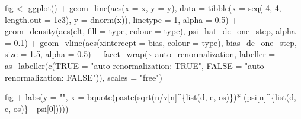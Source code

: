 \documentclass[
  11pt,
  openright,twoside]{book}
\newenvironment{Shaded}{\begin{snugshade}}{\end{snugshade}}
\newcommand{\AttributeTok}[1]{\textcolor[rgb]{0.77,0.63,0.00}{#1}}
\newcommand{\DecValTok}[1]{\textcolor[rgb]{0.00,0.00,0.81}{#1}}
\newcommand{\FloatTok}[1]{\textcolor[rgb]{0.00,0.00,0.81}{#1}}
\newcommand{\FunctionTok}[1]{\textcolor[rgb]{0.00,0.00,0.00}{#1}}
\newcommand{\NormalTok}[1]{#1}
\newcommand{\OtherTok}[1]{\textcolor[rgb]{0.56,0.35,0.01}{#1}}
\newcommand{\SpecialCharTok}[1]{\textcolor[rgb]{0.00,0.00,0.00}{#1}}
\newcommand{\StringTok}[1]{\textcolor[rgb]{0.31,0.60,0.02}{#1}}
\theoremstyle{definition}
\theoremstyle{definition}
\theoremstyle{definition}
\theoremstyle{definition}
\theoremstyle{remark}
\begin{document}
\begin{Shaded}
\begin{Highlighting}[]
\NormalTok{fig }\OtherTok{\textless{}{-}} \FunctionTok{ggplot}\NormalTok{() }\SpecialCharTok{+}
  \FunctionTok{geom\_line}\NormalTok{(}\FunctionTok{aes}\NormalTok{(}\AttributeTok{x =}\NormalTok{ x, }\AttributeTok{y =}\NormalTok{ y), }
            \AttributeTok{data =} \FunctionTok{tibble}\NormalTok{(}\AttributeTok{x =} \FunctionTok{seq}\NormalTok{(}\SpecialCharTok{{-}}\DecValTok{4}\NormalTok{, }\DecValTok{4}\NormalTok{, }\AttributeTok{length.out =} \FloatTok{1e3}\NormalTok{),}
                          \AttributeTok{y =} \FunctionTok{dnorm}\NormalTok{(x)),}
            \AttributeTok{linetype =} \DecValTok{1}\NormalTok{, }\AttributeTok{alpha =} \FloatTok{0.5}\NormalTok{) }\SpecialCharTok{+}
  \FunctionTok{geom\_density}\NormalTok{(}\FunctionTok{aes}\NormalTok{(clt, }\AttributeTok{fill =}\NormalTok{ type, }\AttributeTok{colour =}\NormalTok{ type),}
\NormalTok{               psi\_hat\_de\_one\_step, }\AttributeTok{alpha =} \FloatTok{0.1}\NormalTok{) }\SpecialCharTok{+}
  \FunctionTok{geom\_vline}\NormalTok{(}\FunctionTok{aes}\NormalTok{(}\AttributeTok{xintercept =}\NormalTok{ bias, }\AttributeTok{colour =}\NormalTok{ type),}
\NormalTok{             bias\_de\_one\_step, }\AttributeTok{size =} \FloatTok{1.5}\NormalTok{, }\AttributeTok{alpha =} \FloatTok{0.5}\NormalTok{) }\SpecialCharTok{+}
  \FunctionTok{facet\_wrap}\NormalTok{(}\SpecialCharTok{\textasciitilde{}}\NormalTok{ auto\_renormalization,}
             \AttributeTok{labeller =}
               \FunctionTok{as\_labeller}\NormalTok{(}\FunctionTok{c}\NormalTok{(}\StringTok{\textasciigrave{}}\AttributeTok{TRUE}\StringTok{\textasciigrave{}} \OtherTok{=} \StringTok{"auto{-}renormalization: TRUE"}\NormalTok{,}
                             \StringTok{\textasciigrave{}}\AttributeTok{FALSE}\StringTok{\textasciigrave{}} \OtherTok{=} \StringTok{"auto{-}renormalization: FALSE"}\NormalTok{)),}
             \AttributeTok{scales =} \StringTok{"free"}\NormalTok{)}
  
\NormalTok{fig }\SpecialCharTok{+}
  \FunctionTok{labs}\NormalTok{(}\AttributeTok{y =} \StringTok{""}\NormalTok{,}
       \AttributeTok{x =} \FunctionTok{bquote}\NormalTok{(}\FunctionTok{paste}\NormalTok{(}\FunctionTok{sqrt}\NormalTok{(n}\SpecialCharTok{/}\NormalTok{v[n]}\SpecialCharTok{\^{}}\NormalTok{\{}\FunctionTok{list}\NormalTok{(d, e, os)\})}\SpecialCharTok{*}
\NormalTok{                        (psi[n]}\SpecialCharTok{\^{}}\NormalTok{\{}\FunctionTok{list}\NormalTok{(d, e, os)\} }\SpecialCharTok{{-}}\NormalTok{ psi[}\DecValTok{0}\NormalTok{]))))}
\end{Highlighting}
\end{Shaded}
\end{document}
